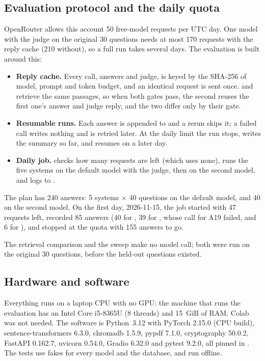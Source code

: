 \subsection{Evaluation protocol and the daily quota}

OpenRouter allows this account 50 free-model requests per UTC day. One model with the judge on the original 30 questions needs at most 170 requests with the reply cache (210 without), so a full run takes several days. The evaluation is built around this:
\begin{itemize}
\item \textbf{Reply cache.} Every call, answers and judge, is keyed by the SHA-256 of model, prompt and token budget, and an identical request is sent once.  and  retrieve the same passages, so when both gates pass, the second reuses the first one's answer and judge reply, and the two differ only by their gate.
\item \textbf{Resumable runs.} Each answer is appended to  and a rerun skips it; a failed call writes nothing and is retried later. At the daily limit the run stops, writes the summary so far, and resumes on a later day.
\item \textbf{Daily job.}  checks how many requests are left (which uses none), runs the five systems on the default model with the judge, then  on the second model, and logs to .
\end{itemize}
The plan has 240 answers: 5 systems $\times$ 40 questions on the default model, and 40 on the second model. On the first day, 2026-11-15, the job started with 47 requests left, recorded 85 answers (40 for , 39 for , whose call for A19 failed, and 6 for ), and stopped at the quota with 155 answers to go. 

The retrieval comparison and the sweep make no model call; both were run on the original 30 questions, before the held-out questions existed.

\subsection{Hardware and software}

Everything runs on a laptop CPU with no GPU: the machine that runs the evaluation has an Intel Core i5-8365U (8 threads) and 15~GiB of RAM. Colab was not needed. The software is Python~3.12 with PyTorch 2.15.0 (CPU build), sentence-transformers 6.3.0, chromadb 1.5.9, pypdf 7.1.0, cryptography 50.0.2, FastAPI 0.162.7, uvicorn 0.54.0, Gradio 6.32.0 and pytest 9.2.0, all pinned in . The tests use fakes for every model and the database, and run offline.

